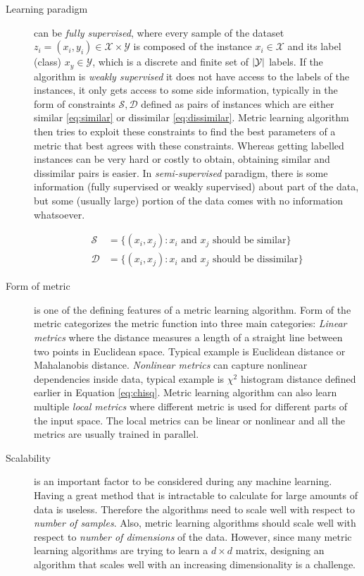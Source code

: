 \documentclass[12pt,a4paper]{report}
\begin{document}
\begin{description}
\item [Learning paradigm] can be \textit{fully supervised}, where every sample of the dataset $z_i=(x_i,y_i) \in \mathcal{X} \times \mathcal{Y}$ is composed of the instance $x_i \in \mathcal{X}$ and its label (class) $x_y \in \mathcal{Y}$, which is a discrete and finite set of $\left|{\mathcal{Y}}\right|$ labels. If the algorithm is \textit{weakly supervised} it does not have access to the labels of the instances, it only gets access to some side information, typically in the form of constraints $\mathcal{S}, \mathcal{D}$ defined as pairs of instances which are either similar \ref{eq:similar} or dissimilar \ref{eq:dissimilar}. Metric learning algorithm then tries to exploit these constraints to find the best parameters of a metric that best agrees with these constraints. Whereas getting labelled instances can be very hard or costly to obtain, obtaining similar and dissimilar pairs is easier. In \textit{semi-supervised} paradigm, there is some information (fully supervised or weakly supervised) about part of the data, but some (usually large) portion of the data comes with no information whatsoever.

\begin{align}
\mathcal{S} &= \lbrace(x_i,x_j): x_i \text{ and } x_j \text{ should be similar} \rbrace \label{eq:similar} \\
\mathcal{D} &= \lbrace(x_i,x_j): x_i \text{ and } x_j \text{ should be dissimilar} \rbrace \label{eq:dissimilar}
\end{align}

\item [Form of metric] is one of the defining features of a metric learning algorithm. Form of the metric categorizes the metric function into three main categories: \textit{Linear metrics} where the distance measures a length of a straight line between two points in Euclidean space. Typical example is Euclidean distance or Mahalanobis distance. \textit{Nonlinear metrics} can capture nonlinear dependencies inside data, typical example is $\chi^2$ histogram distance defined earlier in Equation \ref{eq:chisq}. Metric learning algorithm can also learn multiple \textit{local metrics} where different metric is used for different parts of the input space. The local metrics can be linear or nonlinear and all the metrics are usually trained in parallel.

\item [Scalability] is an important factor to be considered during any machine learning. Having a great method that is intractable to calculate for large amounts of data is useless. Therefore the algorithms need to scale well with respect to \textit{number of samples}. Also, metric learning algorithms should scale well with respect to \textit{number of dimensions} of the data. However, since many metric learning algorithms are trying to learn a $d \times d$ matrix, designing an algorithm that scales well with an increasing dimensionality is a challenge.


\end{description}
\end{document}
